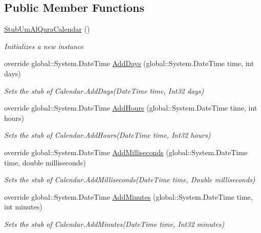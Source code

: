 \subsection*{Public Member Functions}
\begin{DoxyCompactItemize}
\item 
\hyperlink{class_system_1_1_globalization_1_1_fakes_1_1_stub_um_al_qura_calendar_a36a3a43656e728b10f3babb73c2c4d67}{Stub\-Um\-Al\-Qura\-Calendar} ()
\begin{DoxyCompactList}\small\item\em Initializes a new instance\end{DoxyCompactList}\item 
override global\-::\-System.\-Date\-Time \hyperlink{class_system_1_1_globalization_1_1_fakes_1_1_stub_um_al_qura_calendar_a9e2975faf8a0725293ab73aa194f1f40}{Add\-Days} (global\-::\-System.\-Date\-Time time, int days)
\begin{DoxyCompactList}\small\item\em Sets the stub of Calendar.\-Add\-Days(\-Date\-Time time, Int32 days)\end{DoxyCompactList}\item 
override global\-::\-System.\-Date\-Time \hyperlink{class_system_1_1_globalization_1_1_fakes_1_1_stub_um_al_qura_calendar_a631603309ea13d7c886316cb0febfb5f}{Add\-Hours} (global\-::\-System.\-Date\-Time time, int hours)
\begin{DoxyCompactList}\small\item\em Sets the stub of Calendar.\-Add\-Hours(\-Date\-Time time, Int32 hours)\end{DoxyCompactList}\item 
override global\-::\-System.\-Date\-Time \hyperlink{class_system_1_1_globalization_1_1_fakes_1_1_stub_um_al_qura_calendar_ac46cc0d4d5b1b9df3ce0ab8bab395924}{Add\-Milliseconds} (global\-::\-System.\-Date\-Time time, double milliseconds)
\begin{DoxyCompactList}\small\item\em Sets the stub of Calendar.\-Add\-Milliseconds(\-Date\-Time time, Double milliseconds)\end{DoxyCompactList}\item 
override global\-::\-System.\-Date\-Time \hyperlink{class_system_1_1_globalization_1_1_fakes_1_1_stub_um_al_qura_calendar_a558e8148045487782374736db64a9fcb}{Add\-Minutes} (global\-::\-System.\-Date\-Time time, int minutes)
\begin{DoxyCompactList}\small\item\em Sets the stub of Calendar.\-Add\-Minutes(\-Date\-Time time, Int32 minutes)\end{DoxyCompactList}\item 

\end{DoxyCompactItemize}
